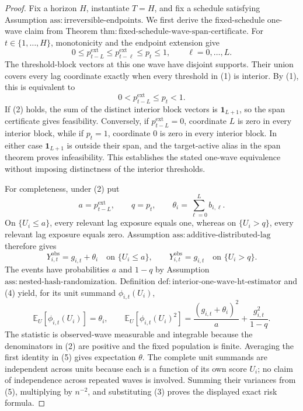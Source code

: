 \documentclass{article}
\begin{document}
\begin{proof}
Fix a horizon \(H\), instantiate \(T=H\), and fix a schedule satisfying Assumption \(\mathrm{ass:irreversible\text{-}endpoints}\).  We first derive the fixed-schedule one-wave claim from Theorem \(\mathrm{thm:fixed\text{-}schedule\text{-}wave\text{-}span\text{-}certificate}\).  For \(t\in\{1,\ldots,H\}\), monotonicity and the endpoint extension give
\[
 0\le p^{\mathrm{ext}}_{t-L}
 \le p^{\mathrm{ext}}_{t-\ell}
 \le p_t\le1,
 \qquad \ell=0,\ldots,L.
\tag{1}
\]
The threshold-block vectors at this one wave have disjoint supports.  Their union covers every lag coordinate exactly when every threshold in (1) is interior.  By (1), this is equivalent to
\[
 0<p^{\mathrm{ext}}_{t-L}\le p_t<1.
\tag{2}
\]
If (2) holds, the sum of the distinct interior block vectors is \(\mathbf 1_{L+1}\), so the span certificate gives feasibility.  Conversely, if \(p^{\mathrm{ext}}_{t-L}=0\), coordinate \(L\) is zero in every interior block, while if \(p_t=1\), coordinate \(0\) is zero in every interior block.  In either case \(\mathbf 1_{L+1}\) is outside their span, and the target-active alias in the span theorem proves infeasibility.  This establishes the stated one-wave equivalence without imposing distinctness of the interior thresholds.

For completeness, under (2) put
\[
 a=p^{\mathrm{ext}}_{t-L},\qquad q=p_t,
 \qquad \theta_i=\sum_{\ell=0}^{L}b_{i,\ell}.
\tag{3}
\]
On \(\{U_i\le a\}\), every relevant lag exposure equals one, whereas on \(\{U_i>q\}\), every relevant lag exposure equals zero.  Assumption \(\mathrm{ass:additive\text{-}distributed\text{-}lag}\) therefore gives
\[
 Y^{\mathrm{obs}}_{i,t}=g_{i,t}+\theta_i
 \quad\text{on }\{U_i\le a\},
 \qquad
 Y^{\mathrm{obs}}_{i,t}=g_{i,t}
 \quad\text{on }\{U_i>q\}.
\tag{4}
\]
The events have probabilities \(a\) and \(1-q\) by Assumption \(\mathrm{ass:nested\text{-}hash\text{-}randomization}\).  Definition \(\mathrm{def:interior\text{-}one\text{-}wave\text{-}ht\text{-}estimator}\) and (4) yield, for its unit summand \(\phi_{i,t}(U_i)\),
\[
 \mathbb E_U[\phi_{i,t}(U_i)]=\theta_i,
 \qquad
 \mathbb E_U[\phi_{i,t}(U_i)^2]
 =\frac{(g_{i,t}+\theta_i)^2}{a}
  +\frac{g_{i,t}^2}{1-q}.
\tag{5}
\]
The statistic is observed-wave measurable and integrable because the denominators in (2) are positive and the fixed population is finite.  Averaging the first identity in (5) gives expectation \(\theta\).  The complete unit summands are independent across units because each is a function of its own score \(U_i\); no claim of independence across repeated waves is involved.  Summing their variances from (5), multiplying by \(n^{-2}\), and substituting (3) proves the displayed exact risk formula.


\end{proof}
\end{document}
